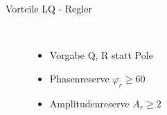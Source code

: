 \begin{description}
	\item[Vorteile LQ - Regler]~\par
	\begin{itemize}
		\item Vorgabe Q, R statt Pole
		\item Phasenreserve $\varphi_r  \geqslant 60 $\textdegree 
		\item Amplitudenreserve $ A_r \geqslant 2 $		
	\end{itemize}
\end{description}

